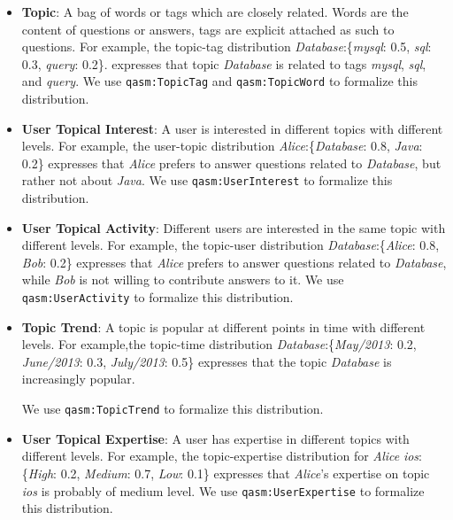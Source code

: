 \begin{itemize}
\item \textbf{Topic}: A bag of words or tags which are closely related. Words are the content of questions or answers, tags are explicit attached as such to questions. For example, the topic-tag distribution \textit{Database}:\{\textit{mysql}: 0.5, \textit{sql}: 0.3, \textit{query}: 0.2\}. expresses that topic \textit{Database} is related to tags \textit{mysql}, \textit{sql}, and \textit{query}. We use \texttt{qasm:TopicTag} and \texttt{qasm:TopicWord} to formalize this distribution.

\item \textbf{User Topical Interest}: A user is interested in different topics with different levels. For example, the user-topic distribution \textit{Alice}:\{\textit{Database}: 0.8, \textit{Java}: 0.2\} expresses that \textit{Alice} prefers to answer questions related to \textit{Database}, but rather not about \textit{Java}. We use \texttt{qasm:UserInterest} to formalize this distribution.

\item \textbf{User Topical Activity}:  Different users are interested in the same topic with different levels. For example, the topic-user distribution \textit{Database}:\{\textit{Alice}: 0.8, \textit{Bob}: 0.2\} expresses that \textit{Alice} prefers to answer questions related to \textit{Database}, while \textit{Bob} is not willing to contribute answers to it. We use \texttt{qasm:UserActivity} to formalize this distribution.

\item \textbf{Topic Trend}: A topic is popular at different points in time with different levels. For example,the topic-time distribution \textit{Database}:\{\textit{May/2013}: 0.2, \textit{June/2013}: 0.3, \textit{July/2013}: 0.5\} expresses that the topic \textit{Database} is increasingly popular. 

We use \texttt{qasm:TopicTrend} to formalize this distribution.

\item \textbf{User Topical Expertise}: A user has expertise in different topics with different levels. For example, the topic-expertise distribution for \textit{Alice} \textit{ios}:\{\textit{High}: 0.2, \textit{Medium}: 0.7, \textit{Low}: 0.1\} expresses that \textit{Alice}'s expertise on topic \textit{ios} is probably of medium level. We use \texttt{qasm:UserExpertise} to formalize this distribution.
\end{itemize}


